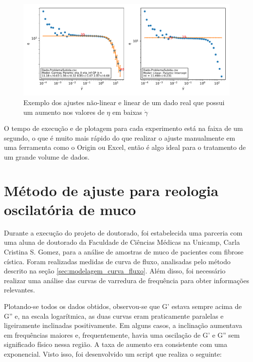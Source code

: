 \begin{apendicesenv}
\begin{figure}
	\centering
	\includegraphics[width=\textwidth]{imagens/reologia/Dado-ProblemaSubida}
	\caption{Exemplo dos ajustes não-linear e linear de um dado real que possui um aumento nos valores de $\eta$ em baixas $\dot{\gamma}$}
	\label{fig:reologia_dado-problemasubida}
\end{figure}

O tempo de execução e de plotagem para cada experimento está na faixa de um segundo, o que é muito mais rápido do que realizar o ajuste manualmente em uma ferramenta como o Origin ou Excel, então é algo ideal para o tratamento de um grande volume de dados.

\section{Método de ajuste para reologia oscilatória de muco}

Durante a execução do projeto de doutorado, foi estabelecida uma parceria com uma aluna de doutorado da Faculdade de Ciências Médicas na Unicamp, Carla Cristina S. Gomez, para a análise de amostras de muco de pacientes com fibrose cística. Foram realizadas medidas de curva de fluxo, analisadas pelo método descrito na seção \ref{sec:modelagem_curva_fluxo}. Além disso, foi necessário realizar uma análise das curvas de varredura de frequência para obter informações relevantes.

Plotando-se todos os dados obtidos, observou-se que G' estava sempre acima de G'' e, na escala logarítmica, as duas curvas eram praticamente paralelas e ligeiramente inclinadas positivamente. Em alguns casos, a inclinação aumentava em frequências maiores e, frequentemente, havia uma oscilação de G' e G'' sem significado físico nessa região. A taxa de aumento era consistente com uma exponencial. Visto isso, foi desenvolvido um script que realiza o seguinte:


\end{apendicesenv}
